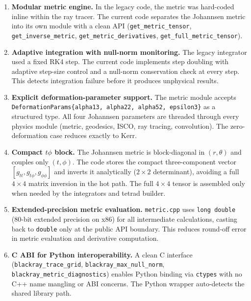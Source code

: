 \documentclass[11pt,twoside]{article}
\begin{document}
\begin{enumerate}[label=\textbf{\arabic*.}, leftmargin=1.5em]
\item \textbf{Modular metric engine.} In the legacy code, the metric was
hard-coded inline within the ray tracer. The current code separates the
Johannsen metric into its own module with a clean API
(\texttt{get\_metric\_tensor}, \texttt{get\_inverse\_metric},
\texttt{get\_metric\_derivatives}, \texttt{get\_full\_metric\_tensor}).

\item \textbf{Adaptive integration with null-norm monitoring.} The legacy
integrator used a fixed RK4 step. The current code implements step doubling
with adaptive step-size control and a null-norm conservation check at every
step. This detects integration failure before it produces unphysical results.

\item \textbf{Explicit deformation-parameter support.} The metric module
accepts \texttt{DeformationParams\{alpha13, alpha22, alpha52, epsilon3\}}
as a structured type. All four Johannsen parameters are threaded through
every physics module (metric, geodesics, ISCO, ray tracing, convolution).
The zero-deformation case reduces exactly to Kerr.

\item \textbf{Compact $t\phi$ block.} The Johannsen metric is
block-diagonal in $(r, \theta)$ and couples only $(t, \phi)$. The code
stores the compact three-component vector $[g_{tt}, g_{t\phi}, g_{\phi\phi}]$
and inverts it analytically ($2\times2$ determinant), avoiding a full
$4\times4$ matrix inversion in the hot path. The full $4\times4$ tensor is
assembled only when needed by the integrators and tetrad builder.

\item \textbf{Extended-precision metric evaluation.} \texttt{metric.cpp}
uses \texttt{long double} (80-bit extended precision on x86) for all
intermediate calculations, casting back to \texttt{double} only at the public
API boundary. This reduces round-off error in metric evaluation and
derivative computation.

\item \textbf{C ABI for Python interoperability.} A clean C interface
(\texttt{blackray\_trace\_grid}, \texttt{blackray\_max\_null\_norm},
\texttt{blackray\_metric\_diagnostics}) enables Python binding via \texttt{ctypes}
with no C++ name mangling or ABI concerns. The Python wrapper auto-detects
the shared library path.


\end{enumerate}
\end{document}
